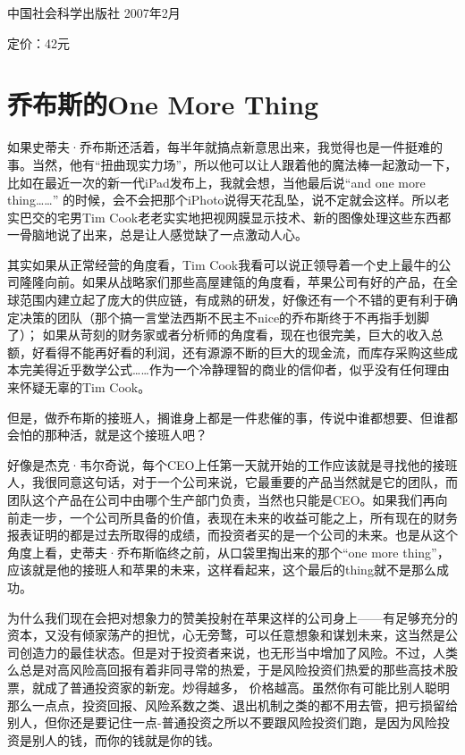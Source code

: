 中国社会科学出版社 2007年2月

定价：42元

\hypertarget{ux4e54ux5e03ux65afux7684one-more-thing}{%
\section{乔布斯的One More
Thing}\label{ux4e54ux5e03ux65afux7684one-more-thing}}

如果史蒂夫·乔布斯还活着，每半年就搞点新意思出来，我觉得也是一件挺难的事。当然，他有``扭曲现实力场''，所以他可以让人跟着他的魔法棒一起激动一下，比如在最近一次的新一代iPad发布上，我就会想，当他最后说``and
one more thing\ldots\ldots''
的时候，会不会把那个iPhoto说得天花乱坠，说不定就会这样。所以老实巴交的宅男Tim
Cook老老实实地把视网膜显示技术、新的图像处理这些东西都一骨脑地说了出来，总是让人感觉缺了一点激动人心。

其实如果从正常经营的角度看，Tim
Cook我看可以说正领导着一个史上最牛的公司隆隆向前。如果从战略家们那些高屋建瓴的角度看，苹果公司有好的产品，在全球范围内建立起了庞大的供应链，有成熟的研发，好像还有一个不错的更有利于确定决策的团队（那个搞一言堂法西斯不民主不nice的乔布斯终于不再指手划脚了）；
如果从苛刻的财务家或者分析师的角度看，现在也很完美，巨大的收入总额，好看得不能再好看的利润，还有源源不断的巨大的现金流，而库存采购这些成本完美得近乎数学公式\ldots\ldots 作为一个冷静理智的商业的信仰者，似乎没有任何理由来怀疑无辜的Tim
Cook。

但是，做乔布斯的接班人，搁谁身上都是一件悲催的事，传说中谁都想要、但谁都会怕的那种活，就是这个接班人吧？

好像是杰克·韦尔奇说，每个CEO上任第一天就开始的工作应该就是寻找他的接班人，我很同意这句话，对于一个公司来说，它最重要的产品当然就是它的团队，而团队这个产品在公司中由哪个生产部门负责，当然也只能是CEO。如果我们再向前走一步，一个公司所具备的价值，表现在未来的收益可能之上，所有现在的财务报表证明的都是过去所取得的成绩，而投资者买的是一个公司的未来。也是从这个角度上看，史蒂夫·乔布斯临终之前，从口袋里掏出来的那个``one
more
thing''，应该就是他的接班人和苹果的未来，这样看起来，这个最后的thing就不是那么成功。

为什么我们现在会把对想象力的赞美投射在苹果这样的公司身上------有足够充分的资本，又没有倾家荡产的担忧，心无旁鹜，可以任意想象和谋划未来，这当然是公司创造力的最佳状态。但是对于投资者来说，也无形当中增加了风险。不过，人类么总是对高风险高回报有着非同寻常的热爱，于是风险投资们热爱的那些高技术股票，就成了普通投资家的新宠。炒得越多，
价格越高。虽然你有可能比别人聪明那么一点点，投资回报、风险系数之类、退出机制之类的都不用去管，把亏损留给别人，但你还是要记住一点-普通投资之所以不要跟风险投资们跑，是因为风险投资是别人的钱，而你的钱就是你的钱。


